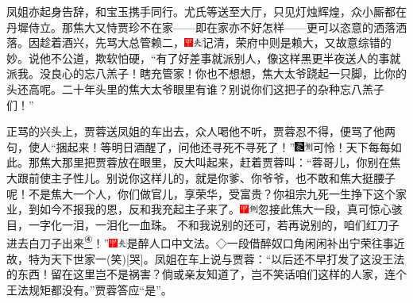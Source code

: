 凤姐亦起身告辞，和宝玉携手同行。尤氏等送至大厅，只见灯烛辉煌，众小厮都在丹墀侍立。那焦大又恃贾珍不在家------即在家亦不好怎样------更可以恣意的洒落洒落。因趁着酒兴，先骂大总管赖二，{\includegraphics[width=3mm]{../Images/00002}\includegraphics[width=3mm]{../Images/00012}\footnotesize \kaishu 记清，荣府中则是赖大，又故意综错的妙。}说他不公道，欺软怕硬，``有了好差事就派别人，像这样黑更半夜送人的事就派我。没良心的忘八羔子！瞎充管家！你也不想想，焦大太爷跷起一只脚，比你的头还高呢。二十年头里的焦大太爷眼里有谁？别说你们这把子的杂种忘八羔子们！''

正骂的兴头上，贾蓉送凤姐的车出去，众人喝他不听，贾蓉忍不得，便骂了他两句，使人``捆起来！等明日酒醒了，问他还寻死不寻死了！''{\includegraphics[width=3mm]{../Images/00006}\includegraphics[width=3mm]{../Images/00011}\footnotesize \kaishu 可怜！天下每每如此。}那焦大那里把贾蓉放在眼里，反大叫起来，赶着贾蓉叫：``蓉哥儿，你别在焦大跟前使主子性儿。别说你这样儿的，就是你爹、你爷爷，也不敢和焦大挺腰子呢！不是焦大一个人，你们做官儿，享荣华，受富贵？你祖宗九死一生挣下这个家业，到如今不报我的恩，反和我充起主子来了。{\includegraphics[width=3mm]{../Images/00002}\includegraphics[width=3mm]{../Images/00011}\footnotesize \kaishu 忽接此焦大一段，真可惊心骇目，一字化一泪，一泪化一血珠。
}不和我说别的还可，若再说别的，咱们红刀子进去白刀子出来\href{../Text/part0011_split_000.html\#lnkback_4_a}{\textsuperscript{④}}！''{{\includegraphics[width=3mm]{../Images/00002}\includegraphics[width=3mm]{../Images/00012}\footnotesize \kaishu 是醉人口中文法。◇一段借醉奴口角闲闲补出宁荣往事近故，特为天下世家一{(笑)}{[}哭{]}。}}凤姐在车上说与贾蓉：``以后还不早打发了这没王法的东西！留在这里岂不是祸害？倘或亲友知道了，岂不笑话咱们这样的人家，连个王法规矩都没有。''贾蓉答应``是''。

